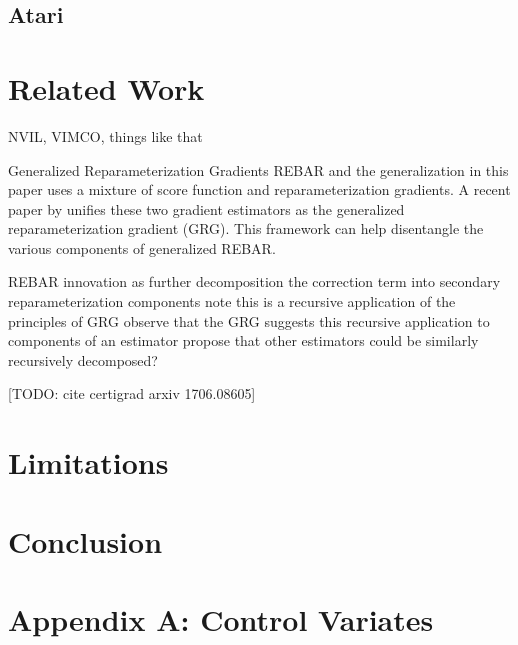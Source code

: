 \documentclass{article}
\begin{document}
\subsection{Atari}

\citet{mnih-dqn-2015}


\section{Related Work}
\label{related work}

NVIL, VIMCO, things like that

\par{Generalized Reparameterization Gradients}
REBAR and the generalization in this paper uses a mixture of score function and reparameterization gradients.
A recent paper by \cite{ruiz2016generalized} unifies these two gradient estimators as the generalized reparameterization gradient (GRG).
This framework can help disentangle the various components of generalized REBAR.

REBAR innovation as further decomposition the correction term into secondary reparameterization components
note this is a recursive application of the principles of GRG
observe that the GRG suggests this recursive application to components of an estimator
propose that other estimators could be similarly recursively decomposed?


[TODO: cite certigrad arxiv 1706.08605]



\section{Limitations}
\label{limitation}

\section{Conclusion}
\label{conclusion}






\section{Appendix A: Control Variates}


\end{document}
